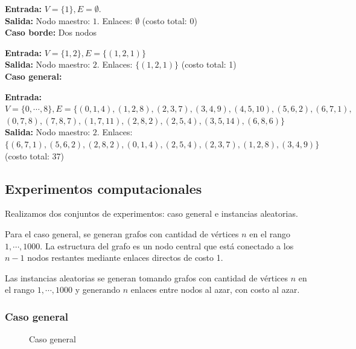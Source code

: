 \documentclass[a4paper, 10pt, twoside]{article}
\newcommand{\dosgraficos}[2]{
    \newcommand{\separacion}{-2.2em}
    \vspace{\separacion}
    
    \vspace{\separacion}
    
}
\begin{document}
\textbf{Entrada:} $V = \{ 1 \}, E = \emptyset$. \\
\textbf{Salida:}  Nodo maestro: $1$. Enlaces: $\emptyset$ (costo total: 0)
\\

\textbf{Caso borde:} Dos nodos

\textbf{Entrada:} $V = \{ 1, 2 \}, E = \{ (1, 2, 1) \}$\\
\textbf{Salida:} Nodo maestro: $2$. Enlaces: $\{ (1, 2, 1) \}$ (costo total: 1)
\\

\textbf{Caso general:}

\textbf{Entrada:} $V = \{ 0, \cdots, 8 \}, E = \{ (0, 1, 4), (1, 2, 8), (2, 3, 7), (3, 4, 9), (4, 5, 10), (5, 6, 2), (6, 7, 1),$\\
$(0, 7, 8), (7, 8, 7), (1, 7, 11), (2, 8, 2), (2, 5, 4), (3, 5, 14), (6, 8, 6) \}$\\
\textbf{Salida:} Nodo maestro: $2$. Enlaces: $\{ (6, 7, 1), (5, 6, 2), (2, 8, 2), (0, 1, 4), (2, 5, 4), (2, 3, 7), (1, 2, 8), (3, 4, 9) \}$ (costo total: 37)


\subsection{Experimentos computacionales}

Realizamos dos conjuntos de experimentos: caso general e instancias aleatorias.

Para el caso general, se generan grafos con cantidad de vértices $n$ en el rango $1, \cdots, 1000$. La estructura del grafo es un nodo central que está conectado a los $n - 1$ nodos restantes mediante enlaces directos de costo 1.

Las instancias aleatorias se generan tomando grafos con cantidad de vértices $n$ en el rango $1, \cdots, 1000$ y generando $n$ enlaces entre nodos al azar, con costo al azar.

\newpage


\subsubsection{Caso general}

\begin{figure}[H]
  \centering
  \dosgraficos{problema2-caso-general}
              {problema2-caso-general-n}
  \caption{Caso general}
\end{figure}
\end{document}
